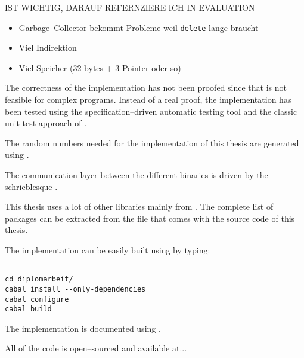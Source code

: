 \begin{JWtodoBox}

  IST WICHTIG, DARAUF REFERNZIERE ICH IN EVALUATION

  \begin{itemize}

    \item Garbage--Collector bekommt Probleme weil \texttt{delete} lange braucht

    \item Viel Indirektion

    \item Viel Speicher (32 bytes + 3 Pointer oder so)

  \end{itemize}

\end{JWtodoBox}



The correctness of the implementation has not been proofed since that is not
feasible for complex programs. Instead of a real proof, the implementation
has been tested using the specification--driven automatic \JWThaskell{} testing
tool \JWTquickcheck{} \cite{quickcheck} and the classic unit test approach of
\JWTLhunit{}.



The random numbers needed for the implementation of this thesis are generated
using \JWTLmonadcryptorandom{}.



The communication layer between the different binaries is driven by the
schrieblesque \JWTXLprotobuf{}.



This thesis uses a lot of other libraries mainly from \JWTLhackage{}. The
complete list of packages can be extracted from the file
 that comes with the source code of this thesis.



The implementation can be easily built using \JWTLcabal{} by typing:

\begin{lstlisting}

cd diplomarbeit/
cabal install --only-dependencies
cabal configure
cabal build

\end{lstlisting}


%
%
\label{sec:implementation-doc}

The implementation is documented using \JWTLhaddock{}.



%
%
\label{sec:code-availability}

All of the code is open--sourced and available at...


